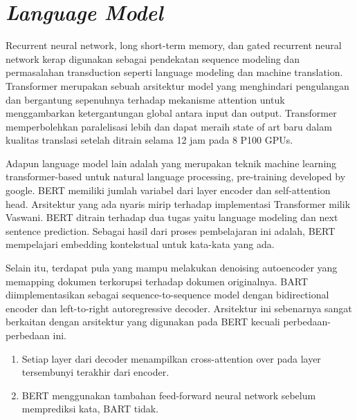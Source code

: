 \section{\textit{Language Model}}

Recurrent neural network, long short-term memory, dan gated recurrent neural network kerap digunakan sebagai pendekatan sequence modeling dan permasalahan transduction seperti language modeling dan machine translation.
Transformer merupakan sebuah arsitektur model yang menghindari pengulangan dan bergantung sepenuhnya terhadap mekanisme attention untuk menggambarkan ketergantungan global antara input dan output.
Transformer memperbolehkan paralelisasi lebih dan dapat meraih state of art baru dalam kualitas translasi setelah ditrain selama 12 jam pada 8 P100 GPUs.

Adapun language model lain adalah  yang merupakan teknik machine learning transformer-based untuk natural language processing, pre-training developed by google.
\gls{BERT} memiliki jumlah variabel dari layer encoder dan self-attention head.
Arsitektur yang ada nyaris mirip terhadap implementasi Transformer milik Vaswani.
\gls{BERT} ditrain terhadap dua tugas yaitu language modeling dan next sentence prediction.
Sebagai hasil dari proses pembelajaran ini adalah, \gls{BERT} mempelajari embedding kontekstual untuk kata-kata yang ada.

Selain itu, terdapat pula  yang mampu melakukan denoising autoencoder yang memapping dokumen terkorupsi terhadap dokumen originalnya.
\gls{BART} diimplementasikan sebagai sequence-to-sequence model dengan bidirectional encoder dan left-to-right autoregressive decoder.
Arsitektur ini sebenarnya sangat berkaitan dengan arsitektur yang digunakan pada \gls{BERT} kecuali perbedaan-perbedaan ini.
\begin{enumerate}
  \item Setiap layer dari decoder menampilkan cross-attention over pada layer tersembunyi terakhir dari encoder.
  \item \gls{BERT} menggunakan tambahan feed-forward neural network sebelum memprediksi kata, \gls{BART} tidak.
\end{enumerate}
